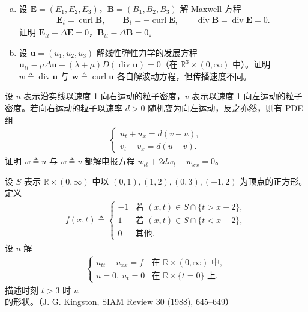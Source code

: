 \documentclass[../../main.tex]{subfiles}
\begin{document}
\begin{exercise}\label{exercise:ch02-21}
\begin{enumerate}[(a)]
\item 设 $\mathbf{E}=(E_1,E_2,E_3)$，$\mathbf{B}=(B_1,B_2,B_3)$ 解 Maxwell 方程
\begin{align*}
\mathbf{E}_t=\operatorname{curl}\mathbf{B},\qquad \mathbf{B}_t=-\operatorname{curl}\mathbf{E},\qquad \operatorname{div}\mathbf{B}=\operatorname{div}\mathbf{E}=0.
\end{align*}
证明 $\mathbf{E}_{tt}-\Delta\mathbf{E}=0$，$\mathbf{B}_{tt}-\Delta\mathbf{B}=0$。
\item 设 $\mathbf{u}=(u_1,u_2,u_3)$ 解线性弹性力学的发展方程 $\mathbf{u}_{tt}-\mu\Delta\mathbf{u}-(\lambda+\mu)D(\operatorname{div}\mathbf{u})=0$（在 $\mathbb{R}^3\times(0,\infty)$ 中）。证明 $w\triangleq\operatorname{div}\mathbf{u}$ 与 $\mathbf{w}\triangleq\operatorname{curl}\mathbf{u}$ 各自解波动方程，但传播速度不同。
\end{enumerate}
\end{exercise}

\begin{exercise}\label{exercise:ch02-22}
设 $u$ 表示沿实线以速度 1 向右运动的粒子密度，$v$ 表示以速度 1 向左运动的粒子密度。若向右运动的粒子以速率 $d>0$ 随机变为向左运动，反之亦然，则有 PDE 组
\begin{align*}
\begin{cases}
u_t+u_x=d(v-u),\\
v_t-v_x=d(u-v).
\end{cases}
\end{align*}
证明 $w\triangleq u$ 与 $w\triangleq v$ 都解电报方程 $w_{tt}+2d w_t-w_{xx}=0$。
\end{exercise}

\begin{exercise}\label{exercise:ch02-23}
设 $S$ 表示 $\mathbb{R}\times(0,\infty)$ 中以 $(0,1),(1,2),(0,3),(-1,2)$ 为顶点的正方形。定义
\begin{align*}
f(x,t)\triangleq
\begin{cases}
-1 & \text{若 }(x,t)\in S\cap\{t>x+2\},\\
1 & \text{若 }(x,t)\in S\cap\{t<x+2\},\\
0 & \text{其他}.
\end{cases}
\end{align*}
设 $u$ 解
\begin{align*}
\begin{cases}
u_{tt}-u_{xx}=f & \text{在 }\mathbb{R}\times(0,\infty)\text{ 中},\\
u=0,\ u_t=0 & \text{在 }\mathbb{R}\times\{t=0\}\text{ 上}.
\end{cases}
\end{align*}
描述时刻 $t>3$ 时 $u$ 的形状。（J. G. Kingston, SIAM Review 30 (1988), 645--649）
\end{exercise}
\end{document}
